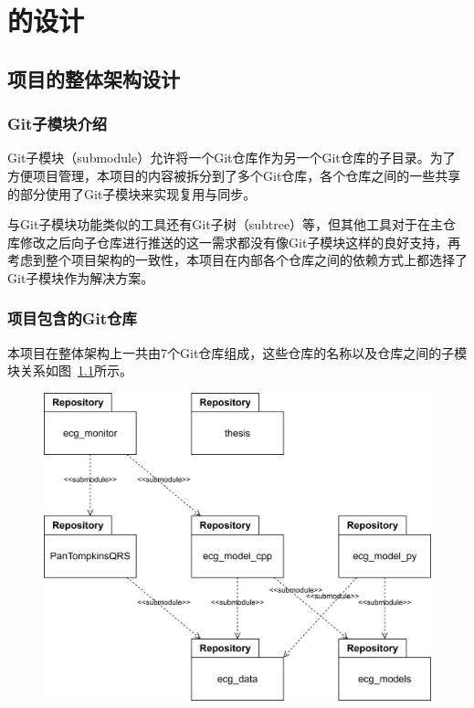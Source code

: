 \chapter{\app 的设计}\label{ch:design}


\section{项目的整体架构设计}\label{sec:arch-design}

\subsection{Git子模块介绍}\label{subsec:git-submodule}

Git子模块（submodule）允许将一个Git仓库作为另一个Git仓库的子目录。为了方便项目管理，本项目的内容被拆分到了多个Git仓库，各个仓库之间的一些共享的部分使用了Git子模块来实现复用与同步。

与Git子模块功能类似的工具还有Git子树（subtree）等，但其他工具对于在主仓库修改之后向子仓库进行推送的这一需求都没有像Git子模块这样的良好支持，再考虑到整个项目架构的一致性，本项目在内部各个仓库之间的依赖方式上都选择了Git子模块作为解决方案。

\subsection{项目包含的Git仓库}\label{subsec:git-repositories}

本项目在整体架构上一共由7个Git仓库组成，这些仓库的名称以及仓库之间的子模块关系如图~\ref{fig:repositories}所示。

\begin{figure}[h]
    \centering
    \includegraphics[width=\textwidth]{../assets/repositories.drawio}
    \label{fig:repositories}
\end{figure}

